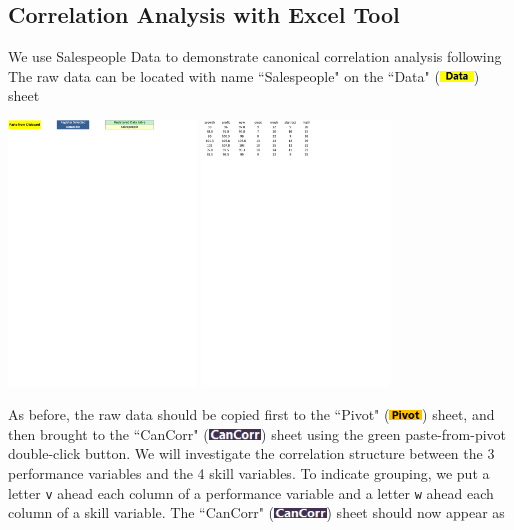 \documentclass[article]{jss}
\newcommand{\shtData}{``Data" (\includegraphics[height=8pt, keepaspectratio=true]{DataSheetTab_png}) }
\newcommand{\shtPivot}{``Pivot" (\includegraphics[height=8pt, keepaspectratio=true]{PivotSheetTab_png}) }
\newcommand{\shtCanCorr}{``CanCorr" (\includegraphics[height=8pt, keepaspectratio=true]{CanCorrSheetTab_png}) }
\begin{document}
        
        \subsection[egCCA]{Correlation Analysis with Excel Tool}
        We use Salespeople Data to demonstrate canonical correlation analysis following \cite{anderson2003introMVA3e} The raw data can be located with name ``Salespeople" on the \shtData sheet 
            \begin{center}
              \includegraphics[height=200pt, keepaspectratio=true]{img/DataSheet_Salespeople}
              \vspace{-20pt}\includegraphics[height=200pt, keepaspectratio=true]{img/DataSheet_Salespeople2}
            \end{center}
        As before, the raw data should be copied first to the \shtPivot sheet, and then brought to the \shtCanCorr sheet using the green paste-from-pivot double-click button. We will investigate the correlation structure between the 3 performance variables and the 4 skill variables. To indicate grouping, we put a letter \texttt{v} ahead each column of a performance variable and a letter \texttt{w} ahead each column of a skill variable. The \shtCanCorr sheet should now appear as
\end{document}
